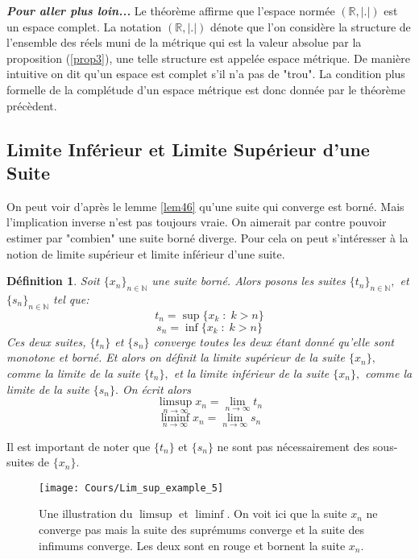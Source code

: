 \documentclass[a4paper, 12pt, french, twoside]{article}
\newtheorem{defi}[theorem]{Définition}
\newcommand{\Nn}{{\mathbb{N}}}
\newcommand{\Rr}{{\mathbb{R}}}
\begin{document}
\textit{\textbf{Pour aller plus loin...}}
Le théorème affirme que l'espace normée $(\Rr, |.|)$ est un espace complet. La notation $(\Rr, |.|)$ dénote que l'on considère la structure de l'ensemble des réels muni de la métrique qui est la valeur absolue par la proposition (\ref{prop3}), une telle structure est appelée espace métrique. De manière intuitive on dit qu'un espace est complet s'il n'a pas de "trou". La condition plus formelle de la complétude d'un espace métrique est donc donnée par le théorème précèdent. 

\subsection{Limite Inférieur et Limite Supérieur d'une Suite}
On peut voir d'après le lemme \ref{lem46} qu'une suite qui converge est 
borné. Mais l'implication inverse n'est pas toujours vraie. On aimerait par contre pouvoir estimer par "combien" une suite borné diverge. 
Pour cela on peut s'intéresser à la notion de limite supérieur et limite inférieur d'une suite.

\begin{defi}
    Soit $\{x_n\}_{n\in \Nn}$ une suite borné. Alors posons  les suites $\{t_n\}_{n\in\Nn},$ et $\{s_n\}_{n\in \Nn}$ tel que:
    \[
    t_n = \sup\{x_k \; : \; k > n\}
    \]
    \[
    s_n = \inf\{x_k \; : \; k > n\}
    \]
    Ces deux suites, $\{t_n\}$ et $\{s_n\}$ converge toutes les deux 
    étant donné qu'elle sont monotone et borné. Et alors on définit la 
    limite supérieur de la suite $\{x_n\},$ comme la limite de la suite 
    $\{t_n\}, $ et la limite inférieur de la suite $\{x_n\},$ comme la 
    limite de la suite $\{s_n\}.$ On écrit alors 
    \[
    \limsup_{n \rightarrow \infty} x_n = \lim_{n \rightarrow \infty} t_n
    \]
    \[
    \liminf_{n \rightarrow \infty} x_n = \lim_{n \rightarrow \infty} s_n
    \]
    
\end{defi} 
Il est important de noter que $\{t_n\}$ et $\{s_n\}$ ne sont pas nécessairement des sous-suites de $\{x_n\}.$ 

\begin{figure}[H]
    \centering
    \texttt{[image: Cours/Lim\_sup\_example\_5]}
    \caption{Une illustration du $\limsup$ et $\liminf.$ 
    On voit ici que la suite $x_n$ ne converge pas mais la suite des suprémums converge et la suite des infimums converge. Les deux sont en rouge et bornent la suite $x_n$.}
    \label{fig:enter-label}
\end{figure}
\end{document}
